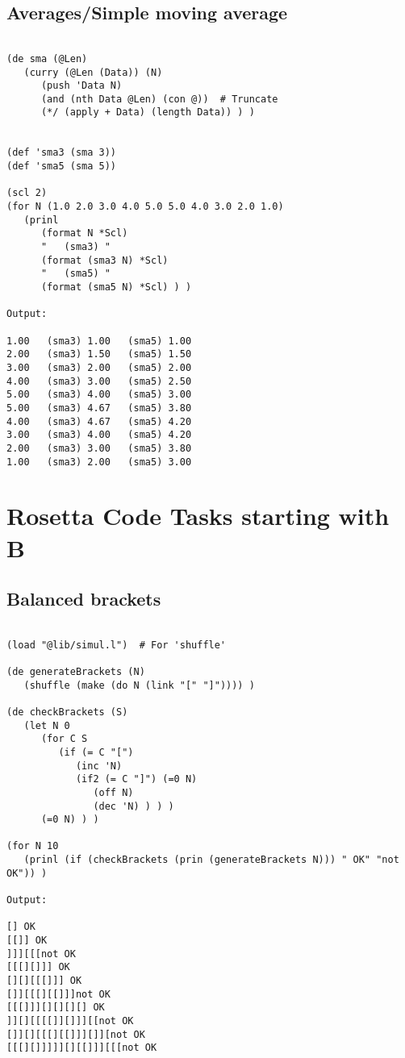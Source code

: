 \section*{Averages/Simple moving average}

\begin{verbatim}

(de sma (@Len)
   (curry (@Len (Data)) (N)
      (push 'Data N)
      (and (nth Data @Len) (con @))  # Truncate
      (*/ (apply + Data) (length Data)) ) )


(def 'sma3 (sma 3))
(def 'sma5 (sma 5))

(scl 2)
(for N (1.0 2.0 3.0 4.0 5.0 5.0 4.0 3.0 2.0 1.0)
   (prinl
      (format N *Scl)
      "   (sma3) "
      (format (sma3 N) *Scl)
      "   (sma5) "
      (format (sma5 N) *Scl) ) )

Output:

1.00   (sma3) 1.00   (sma5) 1.00
2.00   (sma3) 1.50   (sma5) 1.50
3.00   (sma3) 2.00   (sma5) 2.00
4.00   (sma3) 3.00   (sma5) 2.50
5.00   (sma3) 4.00   (sma5) 3.00
5.00   (sma3) 4.67   (sma5) 3.80
4.00   (sma3) 4.67   (sma5) 4.20
3.00   (sma3) 4.00   (sma5) 4.20
2.00   (sma3) 3.00   (sma5) 3.80
1.00   (sma3) 2.00   (sma5) 3.00

\end{verbatim}

\chapter{Rosetta Code Tasks starting with B}

\section*{Balanced brackets}

\begin{verbatim}

(load "@lib/simul.l")  # For 'shuffle'

(de generateBrackets (N)
   (shuffle (make (do N (link "[" "]")))) )

(de checkBrackets (S)
   (let N 0
      (for C S
         (if (= C "[")
            (inc 'N)
            (if2 (= C "]") (=0 N)
               (off N)
               (dec 'N) ) ) )
      (=0 N) ) )

(for N 10
   (prinl (if (checkBrackets (prin (generateBrackets N))) " OK" "not OK")) )

Output:

[] OK
[[]] OK
]]][[[not OK
[[[][]]] OK
[][][[[]]] OK
[]][[[][[]]]not OK
[[[]]][][][][] OK
]][][[[[]][]]][[not OK
[]][][[[][[]]][]][not OK
[[[][]]]]][][[]]][[[not OK

\end{verbatim}

